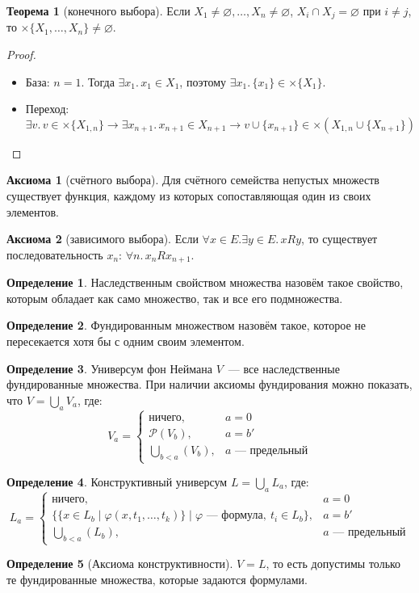 \documentclass[a4paper,11pt]{article}
\theoremstyle{definition}
\newtheorem*{thm}{Теорема}
\newtheorem*{axm}{Аксиома}
\newtheorem*{dfn}{Определение}
\begin{document}
\begin{thm}[конечного выбора]
Если $X_1 \ne \varnothing, \dots, X_n \ne \varnothing$, $X_i \cap X_j =
\varnothing$ при $i \ne j$, то $\times\{X_1, \dots, X_n\} \ne \varnothing$.
\end{thm}
\begin{proof}
\begin{itemize}
\item База: $n = 1$. Тогда $\exists x_1.\,x_1 \in X_1$, поэтому $\exists
  x_1.\,\{x_1\} \in \times\{X_1\}$.
\item Переход:
  \[
  \exists v.\,v \in \times\{X_{1,n}\} \to \exists x_{n+1}.\,x_{n+1} \in X_{n+1} \to v \cup \{x_{n+1}\} \in \times(X_{1,n} \cup \{X_{n+1}\})
  \]
\end{itemize}
\end{proof}
\begin{axm}[счётного выбора]
Для счётного семейства непустых множеств существует функция, каждому из которых
сопоставляющая один из своих элементов.
\end{axm}
\begin{axm}[зависимого выбора]
Если $\forall x \in E.\exists y \in E.\,x R y$, то существует последовательность
$x_n$: $\forall n.\,x_n R x_{n+1}$.
\end{axm}
\begin{dfn}
Наследственным свойством множества назовём такое свойство, которым обладает как
само множество, так и все его подмножества.
\end{dfn}
\begin{dfn}
Фундированным множеством назовём такое, которое не пересекается хотя бы с одним
своим элементом.
\end{dfn}
\begin{dfn}
Универсум фон Неймана $V$~--- все наследственные фундированные множества. При
наличии аксиомы фундирования можно показать, что $V = \bigcup_a V_a$, где:
\[
V_a =
\begin{cases}
\text{ничего}, & a = 0\\
\mathcal{P}(V_b), & a = b'\\
\bigcup_{b < a}(V_b), & a \text{ --- предельный}
\end{cases}
\]
\end{dfn}
\begin{dfn}
Конструктивный универсум $L = \bigcup_a L_a$, где:
\[
L_a =
\begin{cases}
\text{ничего}, & a = 0\\
\{\{x \in L_b \mid \varphi(x, t_1, \dots, t_k)\} \mid \varphi \text{ --- формула},\ t_i \in L_b\}, & a = b'\\
\bigcup_{b < a}(L_b), & a \text{ --- предельный}
\end{cases}
\]
\end{dfn}
\begin{dfn}[Аксиома конструктивности]
$V = L$, то есть допустимы только те фундированные множества, которые задаются
формулами.
\end{dfn}
\end{document}
